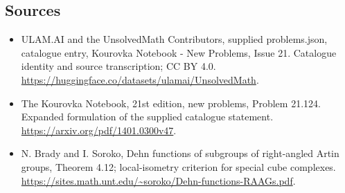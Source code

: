 \documentclass[11pt,a4paper]{article}
\begin{document}
\subsection{Sources}
\begin{itemize}
\item[S1] ULAM.AI and the UnsolvedMath Contributors, supplied problems.json, catalogue entry, Kourovka Notebook - New Problems, Issue 21. Catalogue identity and source transcription; CC BY 4.0.
\url{https://huggingface.co/datasets/ulamai/UnsolvedMath}.
\item[S2] The Kourovka Notebook, 21st edition, new problems, Problem 21.124. Expanded formulation of the supplied catalogue statement.
\url{https://arxiv.org/pdf/1401.0300v47}.
\item[S3] N. Brady and I. Soroko, Dehn functions of subgroups of right-angled Artin groups, Theorem 4.12; local-isometry criterion for special cube complexes.
\url{https://sites.math.unt.edu/~soroko/Dehn-functions-RAAGs.pdf}.
\end{itemize}
\end{document}
